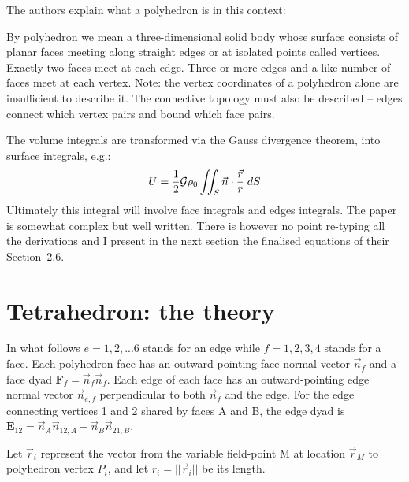 The authors explain what a polyhedron is in this context:
\begin{displayquote}
{\color{darkgray}
By polyhedron we mean a three-dimensional solid body whose surface consists of planar faces 
meeting along straight edges or at isolated points called vertices. Exactly two faces meet 
at each edge. Three or more edges and a like number of faces meet at each vertex. Note: 
the vertex coordinates of a polyhedron alone are insufficient to describe it. The connective 
topology must also be described -- edges connect which vertex pairs and bound which face pairs.}
\end{displayquote}

The volume integrals are transformed via the Gauss divergence theorem, into surface integrals, e.g.:
\[
U = \frac12 {\cal G} \rho_0 \iint_S \vec{n} \cdot \frac{\vec{r}}{r} \; dS
\]
Ultimately this integral will involve face integrals and edges integrals.
The paper is somewhat complex but well written. There is however no point re-typing all 
the derivations and I present in the next section the finalised equations of their Section~2.6.


\section*{Tetrahedron: the theory}

In what follows $e=1,2,...6$ stands for an edge while $f=1,2,3,4$ stands
for a face. 
Each polyhedron face has an outward-pointing face normal vector $\vec{n}_f$
and a face dyad ${\bm F}_f =\vec{n}_f\vec{n}_f $.
Each edge of each face has an outward-pointing edge normal
vector $\vec{n}_{e,f}$ perpendicular to both $\vec{n}_f$ and the edge.
For the edge connecting vertices 1 and 2 shared by faces A and B,
the edge dyad is ${\bm E}_{12}=\vec{n}_A \vec{n}_{12,A}+\vec{n}_B \vec{n}_{21,B}$.

Let $\vec{r}_i$ represent the vector from the variable 
field-point M at location $\vec{r}_M$ to polyhedron vertex $P_i$, 
and let $r_i = ||\vec{r}_i||$ be its length.


